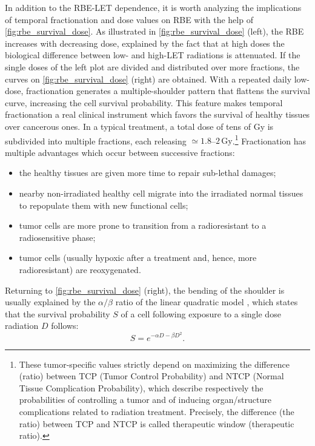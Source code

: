 In addition to the RBE-LET dependence, it is worth analyzing the implications of temporal fractionation and dose values on RBE with the help of \autoref{fig:rbe_survival_dose}. As illustrated in \autoref{fig:rbe_survival_dose} (left), the RBE increases with decreasing dose, explained by the fact that at high doses the biological difference between low- and high-LET radiations is attenuated. If the single doses of the left plot are divided and distributed over more fractions, the curves on \autoref{fig:rbe_survival_dose} (right) are obtained. With a repeated daily low-dose, fractionation generates a multiple-shoulder pattern that flattens the survival curve, increasing the cell survival probability. This feature makes temporal fractionation a real clinical instrument which favors the survival of healthy tissues over cancerous ones. In a typical treatment, a total dose of tens of Gy is subdivided into multiple fractions, each releasing $\simeq1.8$--$2\,\mathrm{Gy}$.\footnote{These tumor-specific values strictly depend on maximizing the difference (ratio) between TCP (Tumor Control Probability) and NTCP (Normal Tissue Complication Probability), which describe respectively the probabilities of controlling a tumor and of inducing organ/structure complications related to radiation treatment. Precisely, the difference (the ratio) between TCP and NTCP is called therapeutic window (therapeutic ratio).} Fractionation has multiple advantages \cite{radiobiologyTextbook} which occur between successive fractions:
\begin{itemize}
	\item the healthy tissues are given more time to repair sub-lethal damages;
	\item nearby non-irradiated healthy cell migrate into the irradiated normal tissues to repopulate them with new functional cells;
	\item tumor cells are more prone to transition from a radioresistant to a radiosensitive phase;
	\item tumor cells (usually hypoxic after a treatment and, hence, more radioresistant) are reoxygenated.
\end{itemize}
Returning to \autoref{fig:rbe_survival_dose} (right), the bending of the shoulder is usually explained by the $\alpha/\beta$ ratio of the linear quadratic model \cite{McMahon_2019}, which states that the survival probability $S$ of a cell following exposure to a single dose radiation $D$ follows:
\begin{equation}
	S=e^{-\alpha D-\beta D^2}.
	\label{eq:linear_quadratic_model}
\end{equation}

